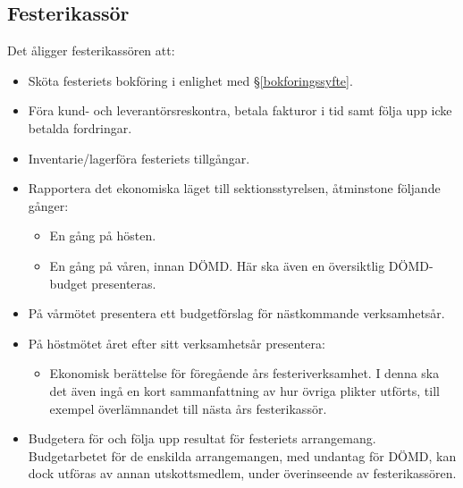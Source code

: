 \documentclass{datateknologsektionen-document}
\begin{document}
\subsection{Festerikassör}
\label{festerikassor}
Det åligger festerikassören att:
\begin{itemize}
  \item Sköta festeriets bokföring i enlighet med \S \ref{bokforingssyfte}.
  \item Föra kund- och leverantörsreskontra, betala fakturor i tid samt följa upp icke betalda fordringar.
  \item Inventarie/lagerföra festeriets tillgångar.
  \item Rapportera det ekonomiska läget till sektionsstyrelsen, åtminstone följande gånger:
  \begin{itemize}
    \item En gång på hösten.
    \item En gång på våren, innan DÖMD. Här ska även en översiktlig DÖMD-budget presenteras.
  \end{itemize}
  \item På vårmötet presentera ett budgetförslag för nästkommande verksamhetsår.
  \item På höstmötet året efter sitt verksamhetsår presentera:
  \begin{itemize}
    \item Ekonomisk berättelse för föregående års festeriverksamhet. I denna ska det även ingå en kort sammanfattning av hur övriga plikter utförts, till exempel överlämnandet till nästa års festerikassör.
  \end{itemize}
  \item Budgetera för och följa upp resultat för festeriets arrangemang. Budgetarbetet för de enskilda arrangemangen, med undantag för DÖMD, kan dock utföras av annan utskottsmedlem, under överinseende av festerikassören.
\end{itemize}
\end{document}
